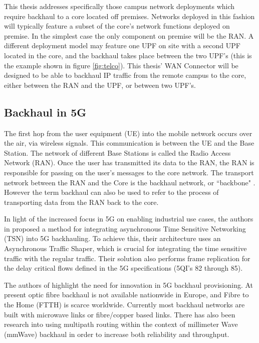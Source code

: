 This thesis addresses specifically those campus network deployments which require backhaul to a core located off premises. Networks deployed in this fashion will typically feature a subset of the core's network functions deployed on premise. In the simplest case the only component on premise will be the RAN. A different deployment model may feature one UPF on site with a second UPF located in the core, and the backhaul takes place between the two UPF's (this is the example shown in figure \ref{fig:telco}). This thesis' WAN Connector will be designed to be able to backhaul IP traffic from the remote campus to the core, either between the RAN and the UPF, or between two UPF's.


\subsection{Backhaul in 5G}

The first hop from the user equipment (UE) into the mobile network occurs over the air, via wireless signals. This communication is between the UE and the Base Station. The network of different Base Stations is called the Radio Access Network (RAN). Once the user has transmitted its data to the RAN, the RAN is responsible for passing on the user's messages to the core network. The transport network between the RAN and the Core is the backhaul network, or “backbone" \cite{jaber20165g}. However the term backhaul can also be used to refer to the process of transporting data from the RAN back to the core.

In light of the increased focus in 5G on enabling industrial use cases, the authors in \cite{prados2021asynchronous} proposed a method for integrating asynchronous Time Sensitive Networking (TSN) into 5G backhauling. To achieve this, their architecture uses an Asynchronous Traffic Shaper, which is crucial for integrating the time sensitive traffic with the regular traffic. Their solution also performs frame replication for the delay critical flows defined in the 5G specifications (5QI's 82 through 85).

The authors of \cite{jaber20165g} highlight the need for innovation in 5G backhaul provisioning. At present optic fibre backhaul is not available nationwide in Europe, and Fibre to the Home (FTTH) is scarce worldwide. Currently most backhaul networks are built with microwave links or fibre/copper based links. There has also been research \cite{seppanen2016multipath, saadat2018multipath} into using multipath routing within the context of millimeter Wave (mmWave) backhaul in order to increase both reliability and throughput.

